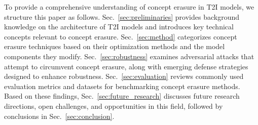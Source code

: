 To provide a comprehensive understanding of concept erasure in T2I models, we structure this paper as follows. Sec.~\ref{sec:preliminaries} provides background knowledge on the architecture of T2I models and introduces key technical concepts relevant to concept erasure. Sec.~\ref{sec:method} categorizes concept erasure techniques based on their optimization methods and the model components they modify. Sec.~\ref{sec:robustness} examines adversarial attacks that attempt to circumvent concept erasure, along with emerging defense strategies designed to enhance robustness. Sec.~\ref{sec:evaluation} reviews commonly used evaluation metrics and datasets for benchmarking concept erasure methods. Based on these findings, Sec.~\ref{sec:future_research} discusses future research directions, open challenges, and opportunities in this field, followed by conclusions in Sec.~\ref{sec:conclusion}.

